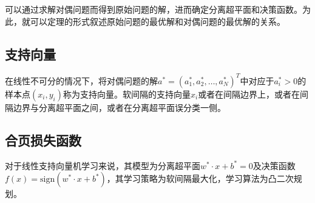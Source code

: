可以通过求解对偶问题而得到原始问题的解，进而确定分离超平面和决策函数。为此，就可以定理的形式叙述原始问题的最优解和对偶问题的最优解的关系。
\subsection*{支持向量}
在线性不可分的情况下，将对偶问题的解$a^*=(a_1^*,a_2^*,\dots,a_N^*)^T$中对应于$a_i^*>0$的样本点$(x_i,y_i)$称为支持向量。软间隔的支持向量$x_i$或者在间隔边界上，或者在间隔边界与分离超平面之间，或者在分离超平面误分类一侧。
\subsection*{合页损失函数}
对于线性支持向量机学习来说，其模型为分离超平面$w^*\cdot x+b^*=0$及决策函数$f(x)=\mathrm{sign}(w^*\cdot x+b^*)$，其学习策略为软间隔最大化，学习算法为凸二次规划。

